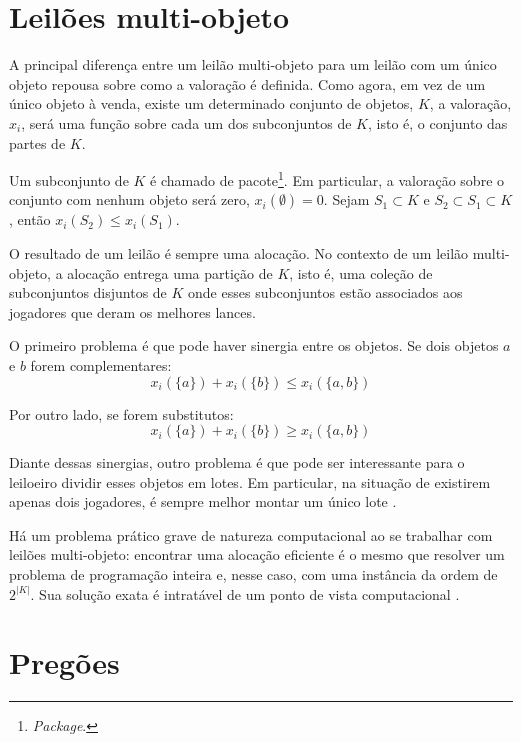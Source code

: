 \section{Leilões multi-objeto}

A principal diferença entre um leilão multi-objeto para um leilão com um único objeto repousa sobre como a valoração é definida. Como agora, em vez de um único objeto à venda, existe um determinado conjunto de objetos, $K$, a valoração, $x_i$, será uma função sobre cada um dos subconjuntos de $K$, isto é, o conjunto das partes de $K$.

Um subconjunto de $K$ é chamado de pacote\footnote{\emph{Package}.}. Em particular, a valoração sobre o conjunto com nenhum objeto será zero, $x_i(\emptyset) = 0$. Sejam $S_1 \subset K$ e $S_2 \subset S_1 \subset K$, então $x_i(S_2) \leq x_i(S_1)$.

O resultado de um leilão é sempre uma alocação. No contexto de um leilão multi-objeto, a alocação entrega uma partição de $K$, isto é, uma coleção de subconjuntos disjuntos de $K$ onde esses subconjuntos estão associados aos jogadores que deram os melhores lances.

O primeiro problema é que pode haver sinergia entre os objetos. Se dois objetos $a$ e $b$ forem complementares:
\begin{equation*}
	x_i(\{a\}) + x_i(\{b\}) \leq x_i(\{a,b\})
\end{equation*}

Por outro lado, se forem substitutos:
\begin{equation*}
	x_i(\{a\}) + x_i(\{b\}) \geq x_i(\{a,b\})
\end{equation*}

Diante dessas sinergias, outro problema é que pode ser interessante para o leiloeiro dividir esses objetos em lotes. Em particular, na situação de existirem apenas dois jogadores, é sempre melhor montar um único lote \citet{krishna}.

Há um problema prático grave de natureza computacional ao se trabalhar com leilões multi-objeto: encontrar uma alocação eficiente é o mesmo que resolver um problema de programação inteira e, nesse caso, com uma instância da ordem de $2^|K|$. Sua solução exata é intratável de um ponto de vista computacional \citet{Nisan2007}.

\section{Pregões}

